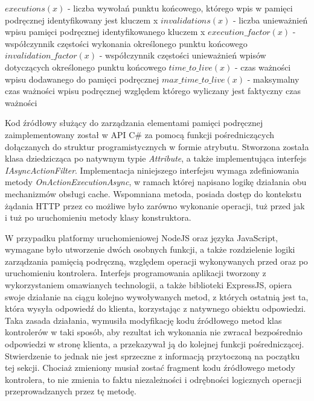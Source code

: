 $executions(x)$ - liczba wywołań punktu końcowego, którego wpis w pamięci podręcznej identyfikowany jest kluczem x \newline\newline
$invalidations(x)$ - liczba unieważnień wpisu pamięci podręcznej identyfikowanego kluczem x \newline\newline
$execution\_factor(x)$ - współczynnik częstości wykonania określonego punktu końcowego \newline\newline
$invalidation\_factor(x)$ - współczynnik częstości unieważnień wpisów dotyczących określonego punktu końcowego \newline\newline
$time\_to\_live(x)$ - czas ważności wpisu dodawanego do pamięci podręcznej \newline\newline
$max\_time\_to\_live(x)$ - maksymalny czas ważności wpisu podręcznej względem którego wyliczany jest faktyczny czas ważności \newline\newline

Kod źródłowy służący do zarządzania elementami pamięci podręcznej zaimplementowany został w API C\# za pomocą funkcji pośredniczących dołączanych do struktur programistycznych w formie atrybutu. Stworzona została klasa dziedzicząca po natywnym typie \textit{Attribute}, a także implementująca interfejs \textit{IAsyncActionFilter}. Implementacja niniejszego interfejsu wymaga zdefiniowania metody \textit{OnActionExecutionAsync}, w ramach której napisano logikę działania obu mechanizmów obsługi cache. Wspomniana metoda, posiada dostęp do kontekstu żądania HTTP przez co możliwe było zarówno wykonanie operacji, tuż przed jak i tuż po uruchomieniu metody klasy konstruktora.

W przypadku platformy uruchomieniowej NodeJS oraz języka JavaScript, wymagane było utworzenie dwóch osobnych funkcji, a także rozdzielenie logiki zarządzania pamięcią podręczną, względem operacji wykonywanych przed oraz po uruchomieniu kontrolera. Interfejs programowania aplikacji tworzony z wykorzystaniem omawianych technologii, a także biblioteki ExpressJS, opiera swoje działanie na ciągu kolejno wywoływanych metod, z których ostatnią jest ta, która wysyła odpowiedź do klienta, korzystając z natywnego obiektu odpowiedzi. Taka zasada działania, wymusiła modyfikację kodu źródłowego metod klas kontrolerów w taki sposób, aby rezultat ich wykonania nie zwracał bezpośrednio odpowiedzi w stronę klienta, a przekazywał ją do kolejnej funkcji pośredniczącej. Stwierdzenie to jednak nie jest sprzeczne z informacją przytoczoną na początku tej sekcji. Chociaż zmieniony musiał zostać fragment kodu źródłowego metody kontrolera, to nie zmienia to faktu niezależności i odrębności logicznych operacji przeprowadzanych przez tę metodę.

